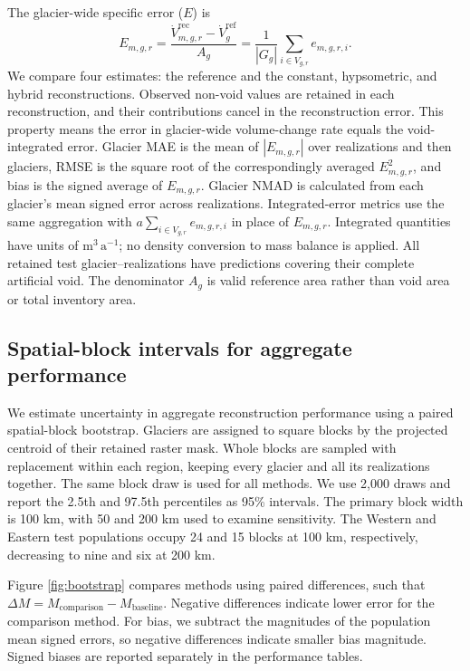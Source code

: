 \documentclass[tc,manuscript]{copernicus}
\newcommand{\volrate}{\ensuremath{\mathrm{m^3\,a^{-1}}}}
\begin{document}
The glacier-wide specific error ($E$) is
\begin{equation}
E_{m,g,r}=\frac{\dot V_{m,g,r}^{\mathrm{rec}}-\dot V_g^{\mathrm{ref}}}{A_g}
=\frac{1}{|G_g|}\sum_{i\in V_{g,r}}e_{m,g,r,i}.
\label{eq:glacier}
\end{equation}
We compare four estimates: the reference and the constant, hypsometric, and hybrid reconstructions. Observed non-void values are retained in each reconstruction, and their contributions cancel in the reconstruction error. This property means the error in glacier-wide volume-change rate equals the void-integrated error. Glacier MAE is the mean of $|E_{m,g,r}|$ over realizations and then glaciers, RMSE is the square root of the correspondingly averaged $E_{m,g,r}^2$, and bias is the signed average of $E_{m,g,r}$. Glacier NMAD is calculated from each glacier's mean signed error across realizations. Integrated-error metrics use the same aggregation with $a\sum_{i\in V_{g,r}}e_{m,g,r,i}$ in place of $E_{m,g,r}$. Integrated quantities have units of \volrate; no density conversion to mass balance is applied. All retained test glacier--realizations have predictions covering their complete artificial void. The denominator $A_g$ is valid reference area rather than void area or total inventory area.

\subsection{Spatial-block intervals for aggregate performance}\label{sec:bootstrap}
We estimate uncertainty in aggregate reconstruction performance using a paired spatial-block bootstrap. Glaciers are assigned to square blocks by the projected centroid of their retained raster mask. Whole blocks are sampled with replacement within each region, keeping every glacier and all its realizations together. The same block draw is used for all methods. We use 2,000 draws and report the 2.5th and 97.5th percentiles as 95\% intervals. The primary block width is 100 km, with 50 and 200 km used to examine sensitivity. The Western and Eastern test populations occupy 24 and 15 blocks at 100 km, respectively, decreasing to nine and six at 200 km.

Figure \ref{fig:bootstrap} compares methods using paired differences, such that $\Delta M=M_{\mathrm{comparison}}-M_{\mathrm{baseline}}$. Negative differences indicate lower error for the comparison method. For bias, we subtract the magnitudes of the population mean signed errors, so negative differences indicate smaller bias magnitude. Signed biases are reported separately in the performance tables.
\end{document}
